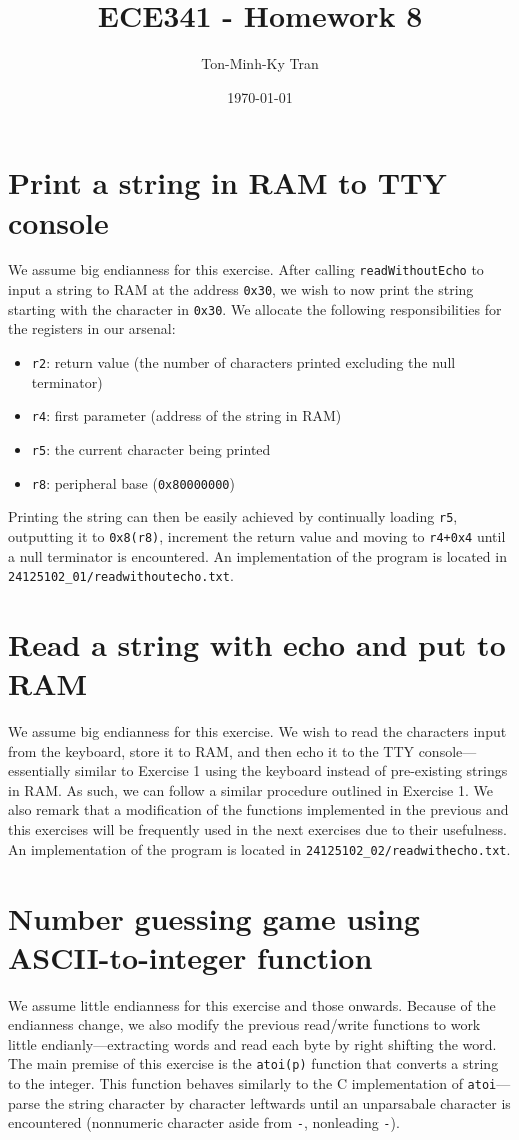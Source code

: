 \documentclass{exam}
\title{ECE341 - Homework 8}
\author{Ton-Minh-Ky Tran}
\date{\today}
\begin{document}
\maketitle

\section{Print a string in RAM to TTY console}
We assume big endianness for this exercise. After calling \verb|readWithoutEcho| to input a string to RAM at the address \verb|0x30|, we wish to now print the string starting with the character in \verb|0x30|. We allocate the following responsibilities for the registers in our arsenal:
\begin{itemize}
	\item \verb|r2|: return value (the number of characters printed excluding the null terminator)
	\item \verb|r4|: first parameter (address of the string in RAM)
	\item \verb|r5|: the current character being printed
	\item \verb|r8|: peripheral base (\verb|0x80000000|)
\end{itemize}
Printing the string can then be easily achieved by continually loading \verb|r5|, outputting it to \verb|0x8(r8)|, increment the return value and moving to \verb|r4+0x4| until a null terminator is encountered. An implementation of the program is located in \verb|24125102_01/readwithoutecho.txt|.

\section{Read a string with echo and put to RAM}
We assume big endianness for this exercise. We wish to read the characters input from the keyboard, store it to RAM, and then echo it to the TTY console---essentially similar to Exercise 1 using the keyboard instead of pre-existing strings in RAM. As such, we can follow a similar procedure outlined in Exercise 1. We also remark that a modification of the functions implemented in the previous and this exercises will be frequently used in the next exercises due to their usefulness. An implementation of the program is located in \verb|24125102_02/readwithecho.txt|.

\section{Number guessing game using ASCII-to-integer function}
We assume little endianness for this exercise and those onwards. Because of the endianness change, we also modify the previous read/write functions to work little endianly---extracting words and read each byte by right shifting the word. The main premise of this exercise is the \verb|atoi(p)| function that converts a string to the integer. This function behaves similarly to the C implementation of \verb|atoi|---parse the string character by character leftwards until an unparsabale character is encountered (nonnumeric character aside from \verb|-|, nonleading \verb|-|).
\end{document}
